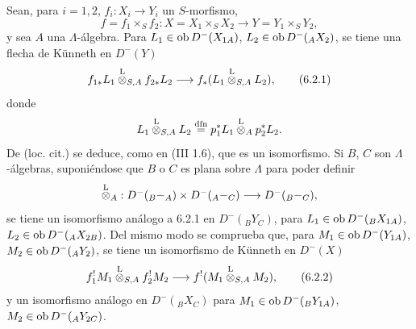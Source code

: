 Sean, para $i=1,2$, $f_i:X_i\to Y_i$ un $S$-morfismo,
\[
f=f_1\times_S f_2:X=X_1\times_SX_2\longrightarrow Y=Y_1\times_SY_2,
\]
y sea $A$ una $\Lambda$-álgebra. Para $L_1\in\operatorname{ob} D^-(X_{1A})$, $L_2\in\operatorname{ob} D^-({}_AX_2)$, se tiene una flecha de Künneth en $D^-(Y)$
\begin{equation}
f_{1*}L_1\overset{\mathrm L}{\otimes}_{S,A}f_{2*}L_2
\longrightarrow
f_*(L_1\overset{\mathrm L}{\otimes}_{S,A}L_2),
\tag{6.2.1}
\end{equation}
donde
\[
L_1\overset{\mathrm L}{\otimes}_{S,A}L_2
\stackrel{\mathrm{dfn}}{=}p_1^*L_1\overset{\mathrm L}{\otimes}_Ap_2^*L_2.
\]
De (loc. cit.) se deduce, como en (III 1.6), que es un isomorfismo. Si $B$, $C$ son $\Lambda$-álgebras, suponiéndose que $B$ o $C$ es plana sobre $\Lambda$ para poder definir
\[
\overset{\mathrm L}{\otimes}_A:D^-({}_B{-}_A)\times D^-({}_A{-}_C)\longrightarrow D^-({}_B{-}_C),
\]
se tiene un isomorfismo análogo a 6.2.1 en $D^-({}_BY_C)$, para $L_1\in\operatorname{ob} D^-({}_BX_{1A})$, $L_2\in\operatorname{ob} D^-({}_AX_{2B})$. Del mismo modo se comprueba que, para $M_1\in\operatorname{ob} D^-(Y_{1A})$, $M_2\in\operatorname{ob} D^-({}_AY_2)$, se tiene un isomorfismo de Künneth en $D^-(X)$
\begin{equation}
f_1^!M_1\overset{\mathrm L}{\otimes}_{S,A}f_2^!M_2
\longrightarrow
f^!(M_1\overset{\mathrm L}{\otimes}_{S,A}M_2),
\tag{6.2.2}
\end{equation}
y un isomorfismo análogo en $D^-({}_B X_C)$ para $M_1\in\operatorname{ob} D^-({}_BY_{1A})$, $M_2\in\operatorname{ob} D^-({}_AY_{2C})$.
